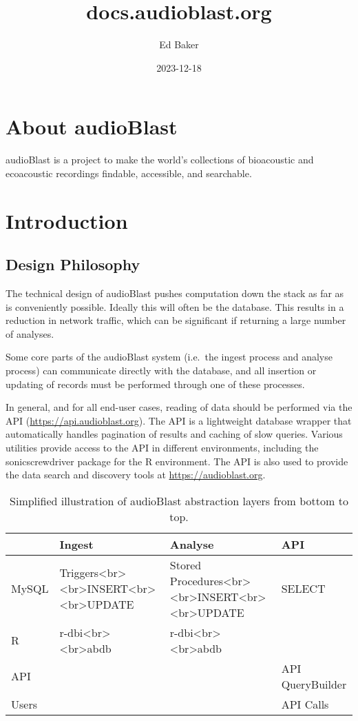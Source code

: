 \documentclass[
]{book}
\title{docs.audioblast.org}
\author{Ed Baker}
\date{2023-12-18}
\begin{document}
\maketitle

{
\setcounter{tocdepth}{1}
\tableofcontents
}
\hypertarget{about-audioblast}{%
\chapter{About audioBlast}\label{about-audioblast}}

audioBlast is a project to make the world's collections of bioacoustic and ecoacoustic recordings findable, accessible, and searchable.

\hypertarget{introduction}{%
\chapter{Introduction}\label{introduction}}

\hypertarget{design-philosophy}{%
\section{Design Philosophy}\label{design-philosophy}}

The technical design of audioBlast pushes computation down the stack as far as is conveniently possible. Ideally this will often be the database. This results in a reduction in network traffic, which can be significant if returning a large number of analyses.

Some core parts of the audioBlast system (i.e.~the ingest process and analyse process) can communicate directly with the database, and all insertion or updating of records must be performed through one of these processes.

In general, and for all end-user cases, reading of data should be performed via the API (\url{https://api.audioblast.org}). The API is a lightweight database wrapper that automatically handles pagination of results and caching of slow queries. Various utilities provide access to the API in different environments, including the sonicscrewdriver package for the R environment. The API is also used to provide the data search and discovery tools at \url{https://audioblast.org}.

\begin{table}

\caption{\label{tab:unnamed-chunk-1}Simplified illustration of audioBlast abstraction layers from 
  bottom to top.}
\centering
\begin{tabular}[t]{llll}
\toprule
  & Ingest & Analyse & API\\
\midrule
MySQL & Triggers<br><br>INSERT<br><br>UPDATE & Stored Procedures<br><br>INSERT<br><br>UPDATE & SELECT\\
R & r-dbi<br><br>abdb & r-dbi<br><br>abdb & \\
API &  &  & API QueryBuilder\\
Users &  &  & API Calls\\
\bottomrule
\end{tabular}
\end{table}
\end{document}
